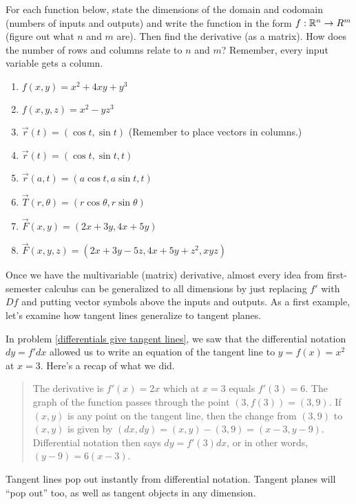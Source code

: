 \begin{problem}
 For each function below, state the dimensions of the domain and codomain (numbers of inputs and outputs) and write the function in the form $f:\mathbb{R}^n\to R^m$ (figure out what $n$ and $m$ are).  Then find the derivative (as a matrix). How does the number of rows and columns relate to $n$ and $m$? Remember, every input variable gets a column. 
\begin{enumerate}
 \item $f(x,y)=x^2+4xy+y^3$
 \item $f(x,y,z)=x^2-yz^3$
 \item $\vec r(t)=(\cos t, \sin t)$ (Remember to place vectors in columns.)
 \item $\vec r(t)=(\cos t, \sin t,t)$
 \item $\vec r(a,t)=(a\cos t, a\sin t,t)$
 \item $\vec T(r,\theta)=(r\cos \theta, r\sin \theta)$
 \item $\vec F(x,y)=(2x+3y,4x+5y)$
 \item $\vec F(x,y,z)=(2x+3y-5z,4x+5y+z^2, xyz)$
\end{enumerate}
\end{problem}

Once we have the multivariable (matrix) derivative, almost every idea from first-semester calculus can be generalized to all dimensions by just replacing $f'$ with $Df$ and putting vector symbols above the inputs and outputs. As a first example, let's examine how tangent lines generalize to tangent planes.

\begin{remark}
  In problem \ref{differentials give tangent lines}, we saw that the differential notation $dy=f'dx$ allowed us to write an equation of the tangent line to $y=f(x)=x^2$ at $x=3$. Here's a recap of what we did.
\begin{quote} The derivative is $f'(x)=2x$ which at $x=3$ equals $f'(3)= 6$. The graph of the function passes through the point $(3,f(3)) = (3,9)$. If $(x,y)$ is any point on the tangent line, then the change from $(3,9)$ to $(x,y)$ is given by $(dx,dy)=(x,y)-(3,9)=(x-3,y-9)$.  Differential notation then says $dy=f'(3)dx$, or in other words, $(y-9)=6(x-3)$.  
\end{quote}
Tangent lines pop out instantly from differential notation. Tangent planes will ``pop out'' too, as well as tangent objects in any dimension. 
\end{remark}


